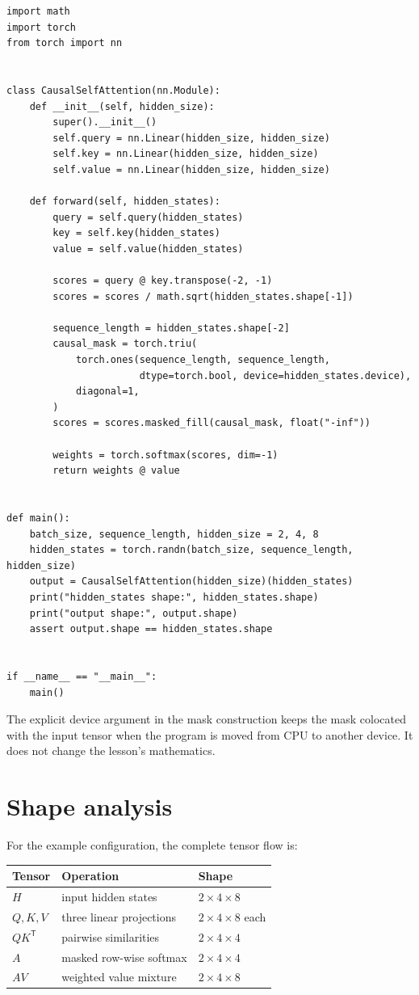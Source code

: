 \documentclass[11pt]{article}
\begin{document}
\begin{lstlisting}
import math
import torch
from torch import nn


class CausalSelfAttention(nn.Module):
    def __init__(self, hidden_size):
        super().__init__()
        self.query = nn.Linear(hidden_size, hidden_size)
        self.key = nn.Linear(hidden_size, hidden_size)
        self.value = nn.Linear(hidden_size, hidden_size)

    def forward(self, hidden_states):
        query = self.query(hidden_states)
        key = self.key(hidden_states)
        value = self.value(hidden_states)

        scores = query @ key.transpose(-2, -1)
        scores = scores / math.sqrt(hidden_states.shape[-1])

        sequence_length = hidden_states.shape[-2]
        causal_mask = torch.triu(
            torch.ones(sequence_length, sequence_length,
                       dtype=torch.bool, device=hidden_states.device),
            diagonal=1,
        )
        scores = scores.masked_fill(causal_mask, float("-inf"))

        weights = torch.softmax(scores, dim=-1)
        return weights @ value


def main():
    batch_size, sequence_length, hidden_size = 2, 4, 8
    hidden_states = torch.randn(batch_size, sequence_length, hidden_size)
    output = CausalSelfAttention(hidden_size)(hidden_states)
    print("hidden_states shape:", hidden_states.shape)
    print("output shape:", output.shape)
    assert output.shape == hidden_states.shape


if __name__ == "__main__":
    main()
\end{lstlisting}

The explicit device argument in the mask construction keeps the mask colocated
with the input tensor when the program is moved from CPU to another device. It
does not change the lesson's mathematics.

\section{Shape analysis}
For the example configuration, the complete tensor flow is:

\begin{center}
\begin{tabular}{lll}
\toprule
Tensor & Operation & Shape \\
\midrule
$H$ & input hidden states & $2\times4\times8$ \\
$Q,K,V$ & three linear projections & $2\times4\times8$ each \\
$QK^\mathsf{T}$ & pairwise similarities & $2\times4\times4$ \\
$A$ & masked row-wise softmax & $2\times4\times4$ \\
$AV$ & weighted value mixture & $2\times4\times8$ \\
\bottomrule
\end{tabular}
\end{center}
\end{document}
